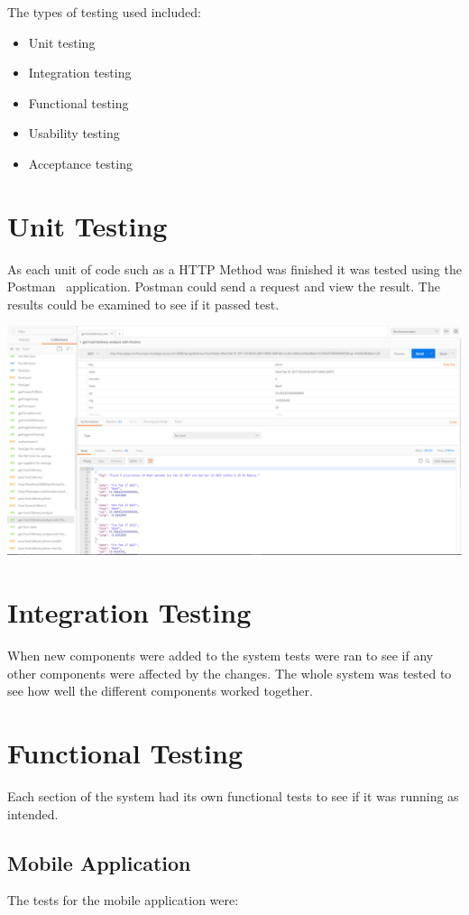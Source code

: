 The types of testing used included:
\begin{itemize}
\item Unit testing
\item Integration testing
\item Functional testing
\item Usability testing
\item Acceptance testing
\end{itemize}

\section{Unit Testing}
As each unit of code such as a HTTP Method was finished it was tested using the Postman~\cite{postman} application. Postman could send a request and view the result. The results could be examined to see if it passed test.

\begin{center}    
    \includegraphics[width=140mm]{img/testing/postmanGet.png}
\end{center}

\section{Integration Testing}
When new components were added to the system tests were ran to see if any other components were affected by the changes. The whole system was tested to see how well the different components worked together.

\section{Functional Testing}
Each section of the system had its own functional tests to see if it was running as intended.

\subsection{Mobile Application}
The tests for the mobile application were:

